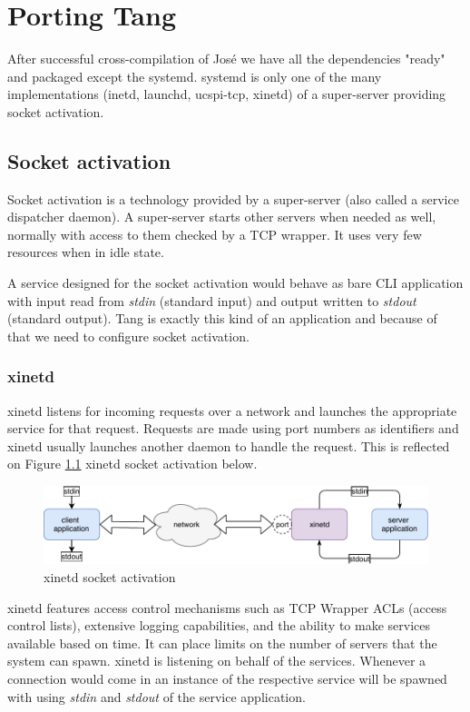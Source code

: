 \chapter{Porting Tang}\label{porting-tang}

After successful cross-compilation of José we have all the dependencies "ready" and packaged except the systemd.
systemd is only one of the many implementations (inetd, launchd, ucspi-tcp, xinetd) of a super-server providing socket activation.



\section{Socket activation}\label{socket_activation}

Socket activation is a technology provided by a super-server (also called a service dispatcher daemon).
A super-server starts other servers when needed as well, normally with access to them checked by a TCP wrapper.
It uses very few resources when in idle state.

A service designed for the socket activation would behave as bare CLI application with input read from {\it stdin} (standard input) and output written to {\it stdout} (standard output).
Tang is exactly this kind of an application and because of that we need to configure socket activation\cite{super_server}. %



\subsection{xinetd}
xinetd listens for incoming requests over a network and launches the appropriate service for that request.
Requests are made using port numbers as identifiers and xinetd usually launches another daemon to handle the request.
This is reflected on Figure \ref{fig_xinetd} xinetd socket activation below.
\begin{figure}[h]
    \centering
    \includegraphics[scale=0.9]{figures/xinetd.pdf}
    \caption{xinetd socket activation}
    \label{fig_xinetd}
\end{figure}
xinetd features access control mechanisms such as TCP Wrapper ACLs (access control lists), extensive logging capabilities, and the ability to make services available based on time.
It can place limits on the number of servers that the system can spawn.
xinetd is listening on behalf of the services.
Whenever a connection would come in an instance of the respective service will be spawned with using {\it stdin} and {\it stdout} of the service application\cite{xinetd}.



